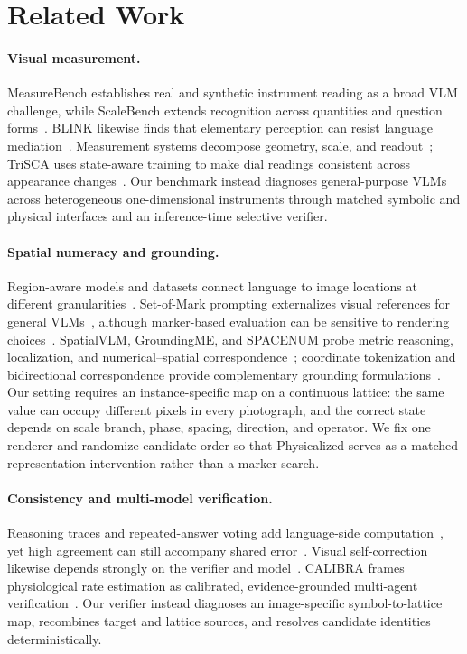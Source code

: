\section{Related Work}
\label{sec:related}

\paragraph{Visual measurement.}
MeasureBench establishes real and synthetic instrument reading as a broad VLM challenge, while ScaleBench extends recognition across quantities and question forms~\cite{lin2026measurebench,jin2026scalebench}. BLINK likewise finds that elementary perception can resist language mediation~\cite{fu2024blink}. Measurement systems decompose geometry, scale, and readout~\cite{reitsma2024underpressure,pan2026rulernet}; TriSCA uses state-aware training to make dial readings consistent across appearance changes~\cite{hu2026trisca}. Our benchmark instead diagnoses general-purpose VLMs across heterogeneous one-dimensional instruments through matched symbolic and physical interfaces and an inference-time selective verifier.

\paragraph{Spatial numeracy and grounding.}
Region-aware models and datasets connect language to image locations at different granularities~\cite{kamath2021mdetr,you2024ferret,deitke2024molmo}. Set-of-Mark prompting externalizes visual references for general VLMs~\cite{yang2023setofmark}, although marker-based evaluation can be sensitive to rendering choices~\cite{feng2025visualpromptfragility}. SpatialVLM, GroundingME, and SPACENUM probe metric reasoning, localization, and numerical--spatial correspondence~\cite{chen2024spatialvlm,li2026groundingme,zhang2026spacenum}; coordinate tokenization and bidirectional correspondence provide complementary grounding formulations~\cite{zhu2026hitoken,zhang2026concor}. Our setting requires an instance-specific map on a continuous lattice: the same value can occupy different pixels in every photograph, and the correct state depends on scale branch, phase, spacing, direction, and operator. We fix one renderer and randomize candidate order so that Physicalized serves as a matched representation intervention rather than a marker search.

\paragraph{Consistency and multi-model verification.}
Reasoning traces and repeated-answer voting add language-side computation~\cite{wei2022chain,wang2023selfconsistency}, yet high agreement can still accompany shared error~\cite{bhat2026consistentwrong,zhang2025consensusentropy}. Visual self-correction likewise depends strongly on the verifier and model~\cite{liao2025selfcorrect}. CALIBRA frames physiological rate estimation as calibrated, evidence-grounded multi-agent verification~\cite{sakib2026calibra}. Our verifier instead diagnoses an image-specific symbol-to-lattice map, recombines target and lattice sources, and resolves candidate identities deterministically.

